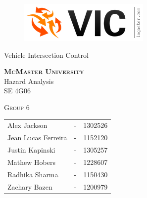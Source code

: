 \documentclass [10pt]{article}
\begin{document}
\begin {center} 

\thispagestyle{empty}
\vspace*{5cm}

\begin {figure}[h!]
\centering
\hspace{-10mm}\includegraphics [scale = .5, trim={.4cm 0 .8cm 0},clip] {figures/vic_logo.png}
\end {figure}

{\fontfamily{\cabinfamily}\selectfont
\Huge{Vehicle Intersection Control} }

\vspace{1 cm}
{\Large\textbf{\textsc{McMaster University}}\\}  \vspace {1cm}
{\Large Hazard Analysis\\ \vspace {0.4 cm} SE 4G06}  \vspace {1cm}

{\large \textsc{Group 6} \\} \vspace{1cm}

\begin{tabular}{ l c  l}
Alex Jackson &-& 1302526\\
Jean Lucas Ferreira &-& 1152120 \\
Justin Kapinski &-& 1305257\\
Mathew Hobers &-& 1228607\\
Radhika Sharma &-& 1150430\\
Zachary Bazen &-& 1200979
\end{tabular}




\end{center}


\pagebreak


\tableofcontents
\listoftables
\listoffigures



\pagebreak


\end{document}
